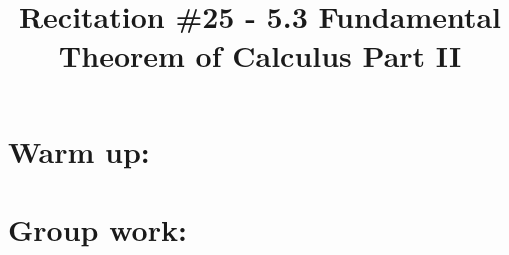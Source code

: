\documentclass[handout,nooutcomes]{ximera}
\title{Recitation \#25 - 5.3 Fundamental Theorem of Calculus Part II}
\begin{document}
\begin{abstract}		\end{abstract}
\maketitle

\section*{Warm up:} 

		\begin{freeResponse}
		
		\end{freeResponse}	
		
		
		

	
	
	
	
	

\section*{Group work:}
\end{document}
